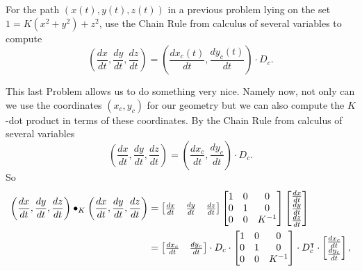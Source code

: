 \documentclass{ximera}
\begin{document}
\begin{problem}
For the path $\left( x\left( t\right) ,y\left( t\right) ,z\left(
t\right) \right) $ in a previous problem lying on the set
$1=K\left(x^{2}+y^{2}\right)+z^{2} $, use the Chain Rule from calculus
of several variables to compute%
\[
\left(  \frac{dx}{dt},\frac{dy}{dt},\frac{dz}{dt}\right)  =\left(
\frac{dx_{c}\left(  t\right)  }{dt},\frac{dy_{c}\left(  t\right)  }%
{dt}\right)  \cdot D_{c}.
\]

\end{problem}

This last Problem allows us to do something very nice. Namely now, not only
can we use the coordinates $\left(  x_{c},y_{c}\right)  $ for our geometry but
we can also compute the $K$-dot product in terms of these coordinates. By the
Chain Rule from calculus of several variables%
\[
\left(  \frac{dx}{dt},\frac{dy}{dt},\frac{dz}{dt}\right)  =\left(
\frac{dx_{c}}{dt},\frac{dy_{c}}{dt}\right)  \cdot D_{c}.
\]
So%
\begin{align*}
\left(  \frac{dx}{dt},\frac{dy}{dt},\frac{dz}{dt}\right)  \bullet_{K}\left(
\frac{dx}{dt},\frac{dy}{dt},\frac{dz}{dt}\right)   &  =\begin{bmatrix}
\frac{dx}{dt} & \frac{dy}{dt} & \frac{dz}{dt}%
\end{bmatrix} \begin{bmatrix}
1 & 0 & 0\\
0 & 1 & 0\\
0 & 0 & K^{-1}%
\end{bmatrix} \begin{bmatrix}
\frac{dx}{dt}\\
\frac{dy}{dt}\\
\frac{dz}{dt}%
\end{bmatrix}\\
&  =
\begin{bmatrix}
\frac{dx_{c}}{dt} & \frac{dy_{c}}{dt}%
\end{bmatrix} \cdot D_{c}\cdot\begin{bmatrix}
1 & 0 & 0\\
0 & 1 & 0\\
0 & 0 & K^{-1}%
\end{bmatrix} \cdot D_{c}^\transpose\cdot
\begin{bmatrix}
\frac{dx_{c}}{dt}\\
\frac{dy_{c}}{dt}%
\end{bmatrix},
\end{align*}
\end{document}
